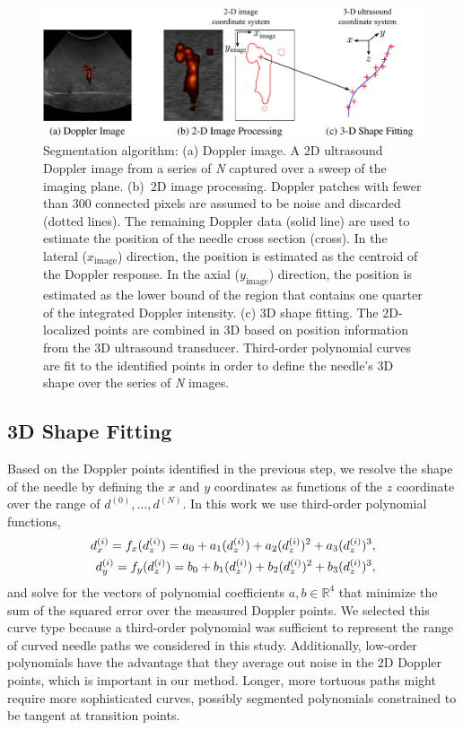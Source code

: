 \begin{figure}[!t]
\centering
\includegraphics[width = \textwidth]{Images/Chapter2/Segmentation/Segmentation}%
\caption[Doppler ultrasound segmentation algorithm]{Segmentation algorithm: (a) Doppler image. A 2D ultrasound Doppler image from a series of \textit{N} captured over a sweep of the imaging plane. (b)~2D image processing. Doppler patches with fewer than 300 connected pixels are assumed to be noise and discarded (dotted lines). The remaining Doppler data (solid line) are used to estimate the position of the needle cross section (cross). In the lateral ($x_\text{image}$) direction, the position is estimated as the centroid of the Doppler response. In the axial ($y_\text{image}$) direction, the position is estimated as the lower bound of the region that contains one quarter of the integrated Doppler intensity. (c) 3D shape fitting. The 2D-localized points are combined in 3D based on position information from the 3D ultrasound transducer. Third-order polynomial curves are fit to the identified points in order to define the needle's 3D shape over the series of \textit{N} images.}
\label{fig:Segmentation}
\end{figure}

\subsection{3D Shape Fitting}
Based on the Doppler points identified in the previous step, we resolve the shape of the needle by defining the $x$ and $y$ coordinates as functions of the $z$ coordinate over the range of $d^{(0)}, \dotsc, d^{(N)}$. In this work we use third-order polynomial functions,
\begin{align}
d^{(i)}_x = f_x(d_z^{(i)}) = a_0 + a_1(d_z^{(i)}) + a_2(d_z^{(i)})^{2} + a_3(d_z^{(i)})^{3},\notag\\
d^{(i)}_y = f_y(d_z^{(i)}) = b_0 + b_1(d_z^{(i)}) + b_2(d_z^{(i)})^{2} + b_3(d_z^{(i)})^{3},\label{result}
\end{align}
and solve for the vectors of polynomial coefficients $a,b \in \mathbb{R}^{4}$ that minimize the sum of the squared error over the measured Doppler points. We selected this curve type because a third-order polynomial was sufficient to represent the range of curved needle paths we considered in this study. Additionally, low-order polynomials have the advantage that they average out noise in the 2D Doppler points, which is important in our method. Longer, more tortuous paths might require more sophisticated curves, possibly segmented polynomials constrained to be tangent at transition points.


